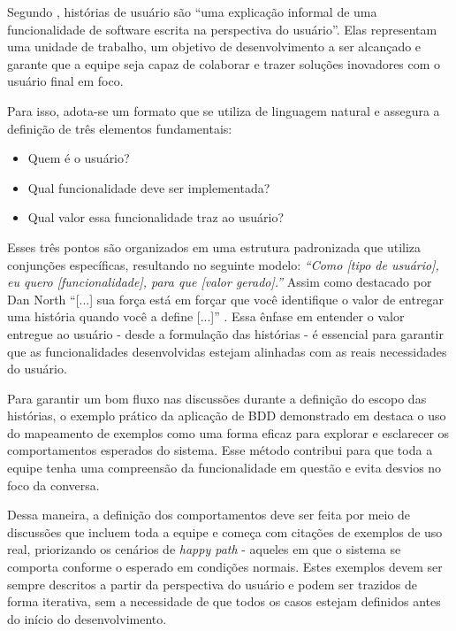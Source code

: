Segundo , histórias de usuário são “uma explicação informal de uma funcionalidade de software escrita na perspectiva do usuário”. Elas 
representam uma unidade de trabalho, um objetivo de desenvolvimento a ser alcançado e garante que a equipe seja capaz de colaborar e trazer soluções inovadores 
com o usuário final em foco.

Para isso, adota-se um formato que se utiliza de linguagem natural e assegura a definição de três elementos fundamentais:

\begin{itemize}
	\item Quem é o usuário?
	\item Qual funcionalidade deve ser implementada?
	\item Qual valor essa funcionalidade traz ao usuário?
\end{itemize}

Esses três pontos são organizados em uma estrutura padronizada que utiliza conjunções específicas, resultando no seguinte modelo:
\textit{“Como [tipo de usuário], eu quero [funcionalidade], para que [valor gerado].”}
Assim como destacado por Dan North ``[...] sua força está em forçar que você identifique o valor de entregar uma história quando você a define [...]'' 
\cite{north2006bdd}. Essa ênfase em entender o valor entregue ao usuário - desde a formulação das histórias - é essencial para garantir que as funcionalidades 
desenvolvidas estejam alinhadas com as reais necessidades do usuário. 

Para garantir um bom fluxo nas discussões durante a definição do escopo das histórias, o exemplo prático da aplicação de BDD demonstrado em  
destaca o uso do mapeamento de exemplos como uma forma eficaz para explorar e esclarecer os comportamentos esperados do sistema. Esse método contribui para que 
toda a equipe tenha uma compreensão da funcionalidade em questão e evita desvios no foco da conversa.

Dessa maneira, a definição dos comportamentos deve ser feita por meio de discussões que incluem toda a equipe e começa com citações de exemplos de uso real, priorizando 
os cenários de \textit{happy path} - aqueles em que o sistema se comporta conforme o esperado em condições normais. Estes exemplos devem ser sempre descritos a partir da 
perspectiva do usuário e podem ser trazidos de forma iterativa, sem a necessidade de que todos os casos estejam definidos antes do início do desenvolvimento.

